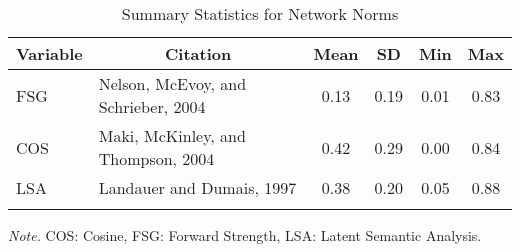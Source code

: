 \documentclass[english,man]{apa6}
\theoremstyle{definition}
\theoremstyle{definition}
\theoremstyle{definition}
\theoremstyle{remark}
\begin{document}
\begin{table}[tbp]
\begin{center}
\begin{threeparttable}
\caption{\label{tab:stim-table-network}Summary Statistics for Network Norms}
\begin{tabular}{llcccc}
\toprule
Variable & \multicolumn{1}{c}{Citation} & \multicolumn{1}{c}{Mean} & \multicolumn{1}{c}{SD} & \multicolumn{1}{c}{Min} & \multicolumn{1}{c}{Max}\\
\midrule
FSG & Nelson, McEvoy, and Schrieber, 2004 & 0.13 & 0.19 & 0.01 & 0.83\\
COS & Maki, McKinley, and Thompson, 2004 & 0.42 & 0.29 & 0.00 & 0.84\\
LSA & Landauer and Dumais, 1997 & 0.38 & 0.20 & 0.05 & 0.88\\
\bottomrule
\addlinespace
\end{tabular}
\begin{tablenotes}[para]
\textit{Note.} COS: Cosine, FSG: Forward Strength, LSA: Latent Semantic Analysis.
\end{tablenotes}
\end{threeparttable}
\end{center}
\end{table}
\end{document}
